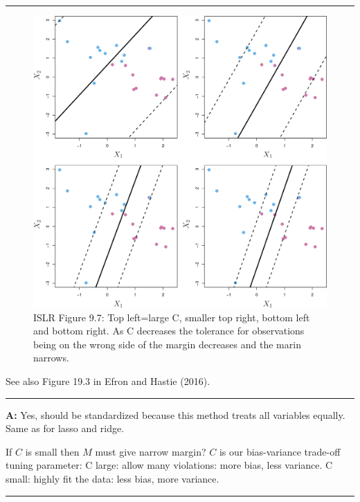 \documentclass[]{article}
\begin{document}
\begin{center}\rule{0.5\linewidth}{\linethickness}\end{center}

\begin{figure}
\centering
\includegraphics{../ISLR/Chapter9/9.7.png}
\caption{ISLR Figure 9.7: Top left=large C, smaller top right, bottom
left and bottom right. As C decreases the tolerance for observations
being on the wrong side of the margin decreases and the marin narrows.}
\end{figure}

See also Figure 19.3 in Efron and Hastie (2016).

\begin{center}\rule{0.5\linewidth}{\linethickness}\end{center}

\textbf{A:} Yes, should be standardized because this method treats all
variables equally. Same as for lasso and ridge.

If \(C\) is small then \(M\) must give narrow margin? \(C\) is our
bias-variance trade-off tuning parameter: C large: allow many
violations: more bias, less variance. C small: highly fit the data: less
bias, more variance.

\begin{center}\rule{0.5\linewidth}{\linethickness}\end{center}
\end{document}
